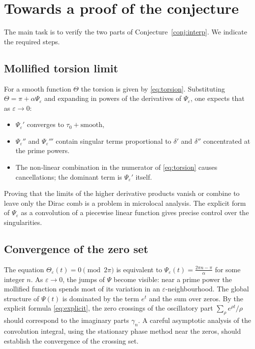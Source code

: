 \documentclass[12pt,a4paper]{article}
\begin{document}
\section{Towards a proof of the conjecture}

The main task is to verify the two parts of Conjecture~\ref{conj:interp}.
We indicate the required steps.

\subsection{Mollified torsion limit}

For a smooth function \(\Theta\) the torsion is given by \eqref{eq:torsion}.
Substituting \(\Theta=\pi+\alpha\Psi_\varepsilon\) and expanding in powers of
the derivatives of \(\Psi_\varepsilon\), one expects that as \(\varepsilon\to0\):
\begin{itemize}
\item \(\Psi_\varepsilon'\) converges to \(\tau_0+\text{smooth}\),
\item \(\Psi_\varepsilon''\) and \(\Psi_\varepsilon'''\) contain singular terms
      proportional to \(\delta'\) and \(\delta''\) concentrated at the prime powers.
\item The non‑linear combination in the numerator of \eqref{eq:torsion} causes
      cancellations; the dominant term is \(\Psi_\varepsilon'\) itself.
\end{itemize}
Proving that the limits of the higher derivative products vanish or combine to
leave only the Dirac comb is a problem in microlocal analysis.  The explicit form
of \(\Psi_\varepsilon\) as a convolution of a piecewise linear function gives
precise control over the singularities.

\subsection{Convergence of the zero set}

The equation \(\Theta_\varepsilon(t)=0\pmod{2\pi}\) is equivalent to
\(\Psi_\varepsilon(t) = \frac{2\pi n - \pi}{\alpha}\) for some integer \(n\).
As \(\varepsilon\to0\), the jumps of \(\Psi\) become visible: near a prime power
the mollified function spends most of its variation in an \(\varepsilon\)-neighbourhood.
The global structure of \(\Psi(t)\) is dominated by the term \(e^t\) and the sum
over zeros.  By the explicit formula \eqref{eq:explicit}, the zero crossings of
the oscillatory part \(\sum_\rho e^{\rho t}/\rho\) should correspond to the
imaginary parts \(\gamma_n\).  A careful asymptotic analysis of the convolution
integral, using the stationary phase method near the zeros, should establish the
convergence of the crossing set.
\end{document}
